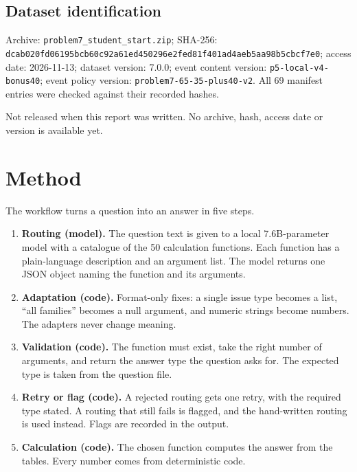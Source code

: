\documentclass[11pt,a4paper]{article}
\begin{document}
\subsection{Dataset identification}
\begin{description}[style=nextline]
  \item[Initial/public stage]
    Archive: \nolinkurl{problem7_student_start.zip}; SHA-256:
    \nolinkurl{dcab020fd06195bcb60c92a61ed450296e2fed81f401ad4aeb5aa98b5cbcf7e0};
    access date: 2026-11-13; dataset version: 7.0.0; event content version:
    \nolinkurl{p5-local-v4-bonus40}; event policy version:
    \nolinkurl{problem7-65-35-plus40-v2}. All 69 manifest entries were checked
    against their recorded hashes.
  \item[Final stage]
    Not released when this report was written. No archive, hash, access date or version is available yet.
\end{description}

\section{Method}
The workflow turns a question into an answer in five steps.

\begin{enumerate}
  \item \textbf{Routing (model).} The question text is given to a local
    7.6B-parameter model with a catalogue of the 50 calculation functions. Each
    function has a plain-language description and an argument list. The model
    returns one JSON object naming the function and its arguments.
  \item \textbf{Adaptation (code).} Format-only fixes: a single issue type
    becomes a list, ``all families'' becomes a null argument, and numeric strings
    become numbers. The adapters never change meaning.
  \item \textbf{Validation (code).} The function must exist, take the right
    number of arguments, and return the answer type the question asks for. The
    expected type is taken from the question file.
  \item \textbf{Retry or flag (code).} A rejected routing gets one retry, with the
    required type stated. A routing that still fails is flagged, and the
    hand-written routing is used instead. Flags are recorded in the output.
  \item \textbf{Calculation (code).} The chosen function computes the answer from
    the tables. Every number comes from deterministic code.
\end{enumerate}
\end{document}
